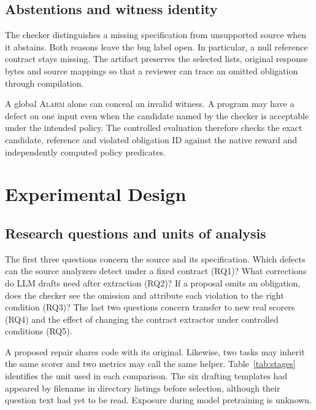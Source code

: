 \documentclass[sigconf]{acmart}
\newcommand{\Alarm}{\textsc{Alarm}}
\begin{document}
\subsection{Abstentions and witness identity}

The checker distinguishes a missing specification from unsupported source when it abstains. Both reasons leave the bug label open. In particular, a null reference contract stays missing. The artifact preserves the selected lists, original response bytes and source mappings so that a reviewer can trace an omitted obligation through compilation.

A global \Alarm{} alone can conceal an invalid witness. A program may have a defect on one input even when the candidate named by the checker is acceptable under the intended policy. The controlled evaluation therefore checks the exact candidate, reference and violated obligation ID against the native reward and independently computed policy predicates.


\section{Experimental Design}

\subsection{Research questions and units of analysis}

The first three questions concern the source and its specification. Which defects can the source analyzers detect under a fixed contract (RQ1)? What corrections do LLM drafts need after extraction (RQ2)? If a proposal omits an obligation, does the checker see the omission and attribute each violation to the right condition (RQ3)? The last two questions concern transfer to new real scorers (RQ4) and the effect of changing the contract extractor under controlled conditions (RQ5).

A proposed repair shares code with its original. Likewise, two tasks may inherit the same scorer and two metrics may call the same helper. Table~\ref{tab:stages} identifies the unit used in each comparison. The six drafting templates had appeared by filename in directory listings before selection, although their question text had yet to be read. Exposure during model pretraining is unknown.
\end{document}
